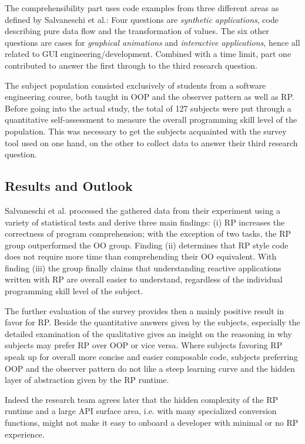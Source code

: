 \documentclass[12pt,a4paper]{article}
\begin{document}
The comprehensibility part uses code examples from three different areas as defined by Salvaneschi et al.: Four questions are \emph{synthetic applications}, code describing pure data flow and the transformation of values. The six other questions are cases for \emph{graphical animations} and \emph{interactive applications}, hence all related to GUI engineering/development. Combined with a time limit, part one contributed to answer the first through to the third research question.

The subject population consisted exclusively of students from a software engineering course, both taught in OOP and the observer pattern as well as RP. Before going into the actual study, the total of 127 subjects were put through a quantitative self-assessment to measure the overall programming skill level of the population. This was necessary to get the subjects acquainted with the survey tool used on one hand, on the other to collect data to answer their third research question.

\subsection{Results and Outlook}

Salvaneschi et al. processed the gathered data from their experiment using a variety of statistical tests and derive three main findings: (i) RP increases the correctness of program comprehension; with the exception of two tasks, the RP group outperformed the OO group. Finding (ii) determines that RP style code does not require more time than comprehending their OO equivalent. With finding (iii) the group finally claims that understanding reactive applications written with RP are overall easier to understand, regardless of the individual programming skill level of the subject.

The further evaluation of the survey provides then a mainly positive result in favor for RP. Beside the quantitative answers given by the subjects, especially the detailed examination of the qualitative gives an insight on the reasoning in why subjects may prefer RP over OOP or vice versa. Where subjects favoring RP speak up for overall more concise and easier composable code, subjects preferring OOP and the observer pattern do not like a steep learning curve and the hidden layer of abstraction given by the RP runtime.

Indeed the research team agrees later that the hidden complexity of the RP runtime and a large API surface area, i.e. with many specialized conversion functions, might not make it easy to onboard a developer with minimal or no RP experience.
\end{document}
